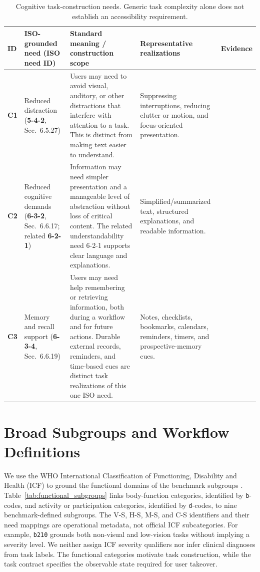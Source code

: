 \documentclass[11pt]{article}
\begin{document}
\begin{table}[t]
\centering
\scriptsize
\begin{tabularx}{\textwidth}{>{\bfseries}p{} p{} p{} X p{}}
\toprule
ID & ISO-grounded need (ISO need ID) & Standard meaning / construction scope & Representative realizations & Evidence \tabularnewline
\midrule
C1 & Reduced distraction (\textbf{5-4-2}, Sec.~6.5.27) & Users may need to avoid visual, auditory, or other distractions that interfere with attention to a task. This is distinct from making text easier to understand. & Suppressing interruptions, reducing clutter or motion, and focus-oriented presentation. & \citep{iso29138,w3ccognitive,cogasimplify,w3cstories} \tabularnewline
C2 & Reduced cognitive demands (\textbf{6-3-2}, Sec.~6.6.17; related \textbf{6-2-1}) & Information may need simpler presentation and a manageable level of abstraction without loss of critical content. The related understandability need 6-2-1 supports clear language and explanations. & Simplified/summarized text, structured explanations, and readable information. & \citep{iso29138,w3ccognitive,cogasimplify,w3cstories} \tabularnewline
C3 & Memory and recall support (\textbf{6-3-4}, Sec.~6.6.19) & Users may need help remembering or retrieving information, both during a workflow and for future actions. Durable external records, reminders, and time-based cues are distinct task realizations of this one ISO need. & Notes, checklists, bookmarks, calendars, reminders, timers, and prospective-memory cues. & \citep{iso29138,cogamemory,cogareminders,w3cstories} \tabularnewline
\bottomrule
\end{tabularx}
\caption{Cognitive task-construction needs.  Generic task complexity alone does not establish an accessibility requirement.}
\label{tab:cognitive_needs}
\end{table}


\section{Broad Subgroups and Workflow Definitions}

We use the WHO International Classification of Functioning, Disability and Health (ICF) to ground the functional domains of the benchmark subgroups \citep{whoicf}. Table~\ref{tab:functional_subgroups} links body-function categories, identified by \texttt{b}-codes, and activity or participation categories, identified by \texttt{d}-codes, to nine benchmark-defined subgroups. The V-S, H-S, M-S, and C-S identifiers and their need mappings are operational metadata, not official ICF subcategories. For example, \texttt{b210} grounds both non-visual and low-vision tasks without implying a severity level. We neither assign ICF severity qualifiers nor infer clinical diagnoses from task labels. The functional categories motivate task construction, while the task contract specifies the observable state required for user takeover.
\end{document}
